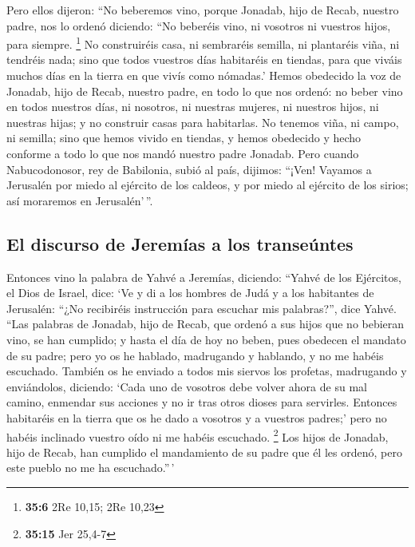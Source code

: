  Pero ellos dijeron: ``No beberemos vino, porque Jonadab,
hijo de Recab, nuestro padre, nos lo ordenó diciendo: ``No beberéis
vino, ni vosotros ni vuestros hijos, para siempre. \footnote{\textbf{35:6}
  2Re 10,15; 2Re 10,23}  No construiréis casa, ni
sembraréis semilla, ni plantaréis viña, ni tendréis nada; sino que todos
vuestros días habitaréis en tiendas, para que viváis muchos días en la
tierra en que vivís como nómadas.'  Hemos obedecido la voz
de Jonadab, hijo de Recab, nuestro padre, en todo lo que nos ordenó: no
beber vino en todos nuestros días, ni nosotros, ni nuestras mujeres, ni
nuestros hijos, ni nuestras hijas;  y no construir casas
para habitarlas. No tenemos viña, ni campo, ni semilla; 
sino que hemos vivido en tiendas, y hemos obedecido y hecho conforme a
todo lo que nos mandó nuestro padre Jonadab.  Pero cuando
Nabucodonosor, rey de Babilonia, subió al país, dijimos: ``¡Ven! Vayamos
a Jerusalén por miedo al ejército de los caldeos, y por miedo al
ejército de los sirios; así moraremos en Jerusalén'\,''.

\hypertarget{el-discurso-de-jeremuxedas-a-los-transeuxfantes}{%
\subsection{El discurso de Jeremías a los
transeúntes}\label{el-discurso-de-jeremuxedas-a-los-transeuxfantes}}

 Entonces vino la palabra de Yahvé a Jeremías, diciendo:
 ``Yahvé de los Ejércitos, el Dios de Israel, dice: `Ve y
di a los hombres de Judá y a los habitantes de Jerusalén: ``¿No
recibiréis instrucción para escuchar mis palabras?'', dice Yahvé.
 ``Las palabras de Jonadab, hijo de Recab, que ordenó a
sus hijos que no bebieran vino, se han cumplido; y hasta el día de hoy
no beben, pues obedecen el mandato de su padre; pero yo os he hablado,
madrugando y hablando, y no me habéis escuchado.  También
os he enviado a todos mis siervos los profetas, madrugando y
enviándolos, diciendo: `Cada uno de vosotros debe volver ahora de su mal
camino, enmendar sus acciones y no ir tras otros dioses para servirles.
Entonces habitaréis en la tierra que os he dado a vosotros y a vuestros
padres;' pero no habéis inclinado vuestro oído ni me habéis escuchado.
\footnote{\textbf{35:15} Jer 25,4-7}  Los hijos de
Jonadab, hijo de Recab, han cumplido el mandamiento de su padre que él
les ordenó, pero este pueblo no me ha escuchado.''\,'

